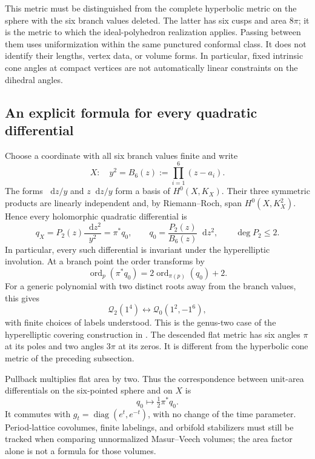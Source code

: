 \documentclass[11pt,a4paper]{article}
\numberwithin{equation}{section}
\theoremstyle{definition}
\theoremstyle{remark}
\DeclareMathOperator{\diag}{diag}
\newcommand{\dd}{\mathop{}\!\mathrm d}
\begin{document}
This metric must be distinguished from the complete hyperbolic
metric on the sphere with the six branch values deleted.  The
latter has six cusps and area $8\pi$; it is the metric to which the
ideal-polyhedron realization applies.  Passing between them uses
uniformization within the same punctured conformal class.  It does
not identify their lengths, vertex data, or volume forms.
In particular, fixed intrinsic cone angles at compact vertices are
not automatically linear constraints on the dihedral angles.

\subsection{An explicit formula for every quadratic differential}
\label{subsec:genus2quadraticformula}

Choose a coordinate with all six branch values finite and write
\begin{equation}
 X:\quad y^2=B_6(z):=\prod_{i=1}^{6}(z-a_i).
 \label{eq:genus2curve}
\end{equation}
The forms $\dd z/y$ and $z\dd z/y$ form a basis of
$H^0(X,K_X)$.  Their three symmetric products are linearly
independent and, by Riemann--Roch, span $H^0(X,K_X^2)$.
Hence every holomorphic quadratic differential is
\begin{equation}
 q_X=P_2(z)\frac{\dd z^2}{y^2}
     =\pi^*q_0,
 \qquad
 q_0=\frac{P_2(z)}{B_6(z)}\dd z^2,
 \qquad \deg P_2\leq2.
 \label{eq:genus2qformula}
\end{equation}
In particular, every such differential is invariant under the
hyperelliptic involution.  At a branch point the order transforms by
\begin{equation}
 \operatorname{ord}_p(\pi^*q_0)
 =2\operatorname{ord}_{\pi(p)}(q_0)+2.
 \label{eq:genus2order}
\end{equation}
For a generic polynomial with two distinct roots away from the
branch values, this gives
\[
 \mathcal Q_2(1^4)\longleftrightarrow
 \mathcal Q_0(1^2,-1^6),
\]
with finite choices of labels understood.  This is the genus-two
case of the hyperelliptic covering construction in
\cite[Section~1.1.3]{LanneauComponents}.
The descended flat metric has six angles $\pi$ at its poles and
two angles $3\pi$ at its zeros.  It is different from the
hyperbolic cone metric of the preceding subsection.

Pullback multiplies flat area by two.  Thus the correspondence
between unit-area differentials on the six-pointed sphere and on
$X$ is
\[
 q_0\longmapsto\tfrac12\pi^*q_0.
\]
It commutes with $g_t=\diag(e^t,e^{-t})$, with no change of the time
parameter.  Period-lattice covolumes, finite labelings, and orbifold
stabilizers must still be tracked when comparing unnormalized
Masur--Veech volumes; the area factor alone is not a formula for
those volumes.
\end{document}
